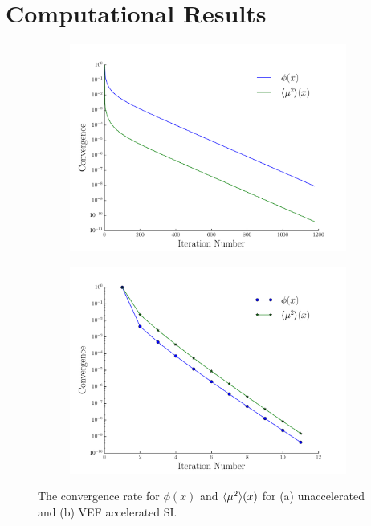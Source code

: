 
\section{Computational Results}
\begin{figure}
\centering
\begin{subfigure}{.515\textwidth}
	\centering
	\includegraphics[width=\textwidth]{figs/si.pdf}
	\caption{}
	\label{fig:si}
\end{subfigure}
\hspace{-2em}
\begin{subfigure}{.515\textwidth}
	\centering
	\includegraphics[width=\textwidth]{figs/vef.pdf} 
	\caption{}
	\label{fig:vef}
\end{subfigure}
\caption{The convergence rate for $\phi(x)$ and $\langle \mu^2 \rangle(x)$ for (a) unaccelerated and (b) VEF accelerated SI. }
\end{figure}

